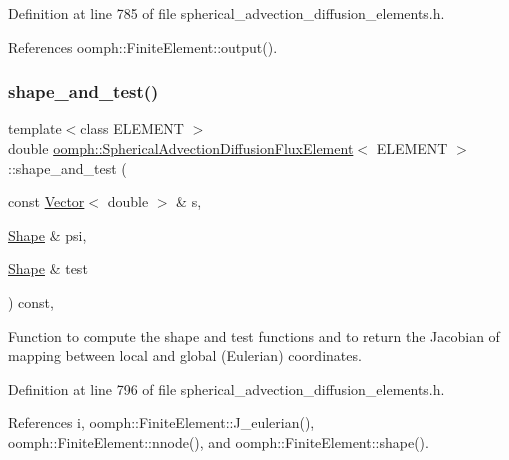 Definition at line 785 of file spherical\+\_\+advection\+\_\+diffusion\+\_\+elements.\+h.



References oomph\+::\+Finite\+Element\+::output().

\mbox{\label{classoomph_1_1SphericalAdvectionDiffusionFluxElement_ae68704bbc324e11392b724b6e3406eb8}} 
\subsubsection{\texorpdfstring{shape\+\_\+and\+\_\+test()}{shape\_and\_test()}}
{\footnotesize\ttfamily template$<$class E\+L\+E\+M\+E\+NT $>$ \\
double \hyperlink{classoomph_1_1SphericalAdvectionDiffusionFluxElement}{oomph\+::\+Spherical\+Advection\+Diffusion\+Flux\+Element}$<$ E\+L\+E\+M\+E\+NT $>$\+::shape\+\_\+and\+\_\+test (\begin{DoxyParamCaption}\item[{const \hyperlink{classoomph_1_1Vector}{Vector}$<$ double $>$ \&}]{s,  }\item[{\hyperlink{classoomph_1_1Shape}{Shape} \&}]{psi,  }\item[{\hyperlink{classoomph_1_1Shape}{Shape} \&}]{test }\end{DoxyParamCaption}) const\hspace{0.3cm}{\ttfamily [inline]}, {\ttfamily [protected]}}



Function to compute the shape and test functions and to return the Jacobian of mapping between local and global (Eulerian) coordinates. 



Definition at line 796 of file spherical\+\_\+advection\+\_\+diffusion\+\_\+elements.\+h.



References i, oomph\+::\+Finite\+Element\+::\+J\+\_\+eulerian(), oomph\+::\+Finite\+Element\+::nnode(), and oomph\+::\+Finite\+Element\+::shape().



